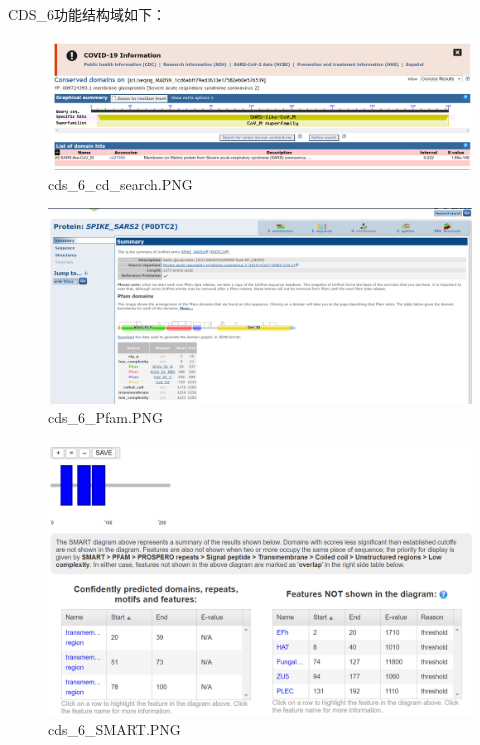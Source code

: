 \documentclass[supercite]{HustGraduPaper}
\begin{document}
	\paragraph{}\label{subpara:subpara}CDS\_6功能结构域如下：
	\begin{figure}[H]
		\centering
		\includegraphics[width=1\textwidth]{./material/practice2/cds_6/cd_search.png}
		\caption{cds\_6\_cd\_search.PNG}
	\end{figure}
	\begin{figure}[H]
		\centering
		\includegraphics[width=1\textwidth]{./material/practice2/cds_6/Pfam.png}
		\caption{cds\_6\_Pfam.PNG}
	\end{figure}
	\begin{figure}[H]
		\centering
		\includegraphics[width=1\textwidth]{./material/practice2/cds_6/SMART.png}
		\caption{cds\_6\_SMART.PNG}
	\end{figure}
\end{document}
